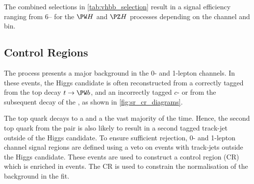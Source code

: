 The combined selections in \cref{tab:vhbb_selection} result in a signal efficiency ranging from 6-- for the $\Wboson\higgs$ and $\Zboson\higgs$ processes depending on the channel and \ptv bin.

%

%

\subsection{Control Regions}\label{sec:vhbb_control_region}


The \ttbar process presents a major background in the 0- and 1-lepton channels.
In these events, the Higgs candidate is often reconstructed from a correctly tagged \bjet from the top decay $t \to \Wboson b$, and an incorrectly tagged $c$- or \ljet from the subsequent decay of the \Wboson, as shown in \cref{fig:sr_cr_diagrams}.

The top quark decays to a \Wboson and a \bquark the vast majority of the time.
Hence, the second top quark from the \ttbar pair is also likely to result in a second tagged \btagged track-jet outside of the \largeR Higgs candidate.
To ensure sufficient \ttbar rejection, 0- and 1-lepton channel signal regions are defined using a veto on events with \btagged track-jets outside the Higgs candidate.
These events are used to construct a control region (CR) which is enriched in \ttbar events.
The CR is used to constrain the normalisation of the \ttbar background in the fit.

